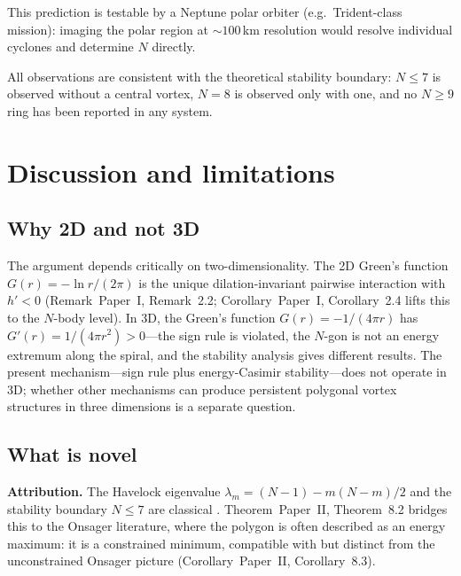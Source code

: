 This prediction is testable by a Neptune polar orbiter (e.g.\
Trident-class mission): imaging the polar region at
$\sim\!100$\,km resolution would resolve individual cyclones and
determine $N$ directly.

All observations are consistent with the theoretical stability
boundary: $N \le 7$ is observed without a central vortex, $N = 8$
is observed only with one, and no $N \ge 9$ ring has been reported
in any system.


\section{Discussion and limitations}
\label{sec:discussion-new}

\subsection{Why 2D and not 3D}

The argument depends critically on two-dimensionality.  The 2D Green's
function $G(r) = -\ln r/(2\pi)$ is the unique dilation-invariant
pairwise interaction with $h' < 0$
(Remark~Paper~I, Remark~2.2; Corollary~Paper~I, Corollary~2.4
lifts this to the $N$-body level).  In 3D, the Green's function
$G(r) = -1/(4\pi r)$ has $G'(r) = 1/(4\pi r^2) > 0$---the sign
rule is violated, the $N$-gon is not an energy extremum along the
spiral, and the stability analysis gives different results.  The
present mechanism---sign rule plus energy-Casimir stability---does
not operate in 3D; whether other mechanisms can produce persistent
polygonal vortex structures in three dimensions is a separate
question.


\subsection{What is novel}

\noindent\textbf{Attribution.}
The Havelock eigenvalue $\lambda_m = (N{-}1) - m(N{-}m)/2$ and the
stability boundary $N \le 7$ are classical \citep{Havelock1931}.
Theorem~Paper~II, Theorem~8.2 bridges this to the Onsager
literature, where the polygon is often described as an energy
maximum: it is a constrained minimum, compatible with but distinct
from the unconstrained Onsager picture (Corollary~Paper~II, Corollary~8.3).

